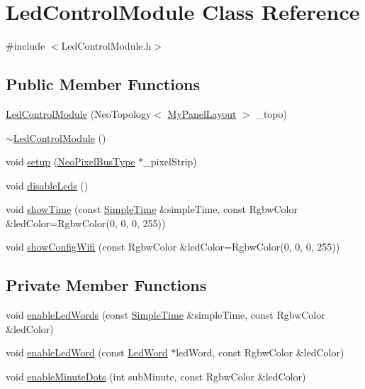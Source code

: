 \hypertarget{class_led_control_module}{}\section{Led\+Control\+Module Class Reference}
\label{class_led_control_module}


{\ttfamily \#include $<$Led\+Control\+Module.\+h$>$}

\subsection*{Public Member Functions}
\begin{DoxyCompactItemize}
\item 
\mbox{\hyperlink{class_led_control_module_a5a653e4a322f618a6937449fafe959bb}{Led\+Control\+Module}} (Neo\+Topology$<$ \mbox{\hyperlink{_led_control_module_8h_a49b2323848e516b3241e758de64f0b3b}{My\+Panel\+Layout}} $>$ \+\_\+topo)
\item 
\mbox{\hyperlink{class_led_control_module_af6763089aa43e6be196651ec6708a4cd}{$\sim$\+Led\+Control\+Module}} ()
\item 
void \mbox{\hyperlink{class_led_control_module_ae1eb70e65006f55b30f6a034706829b5}{setup}} (\mbox{\hyperlink{_led_control_module_8h_a51a7b766d62733fca1ec20e82e024f9f}{Neo\+Pixel\+Bus\+Type}} $\ast$\+\_\+pixel\+Strip)
\item 
void \mbox{\hyperlink{class_led_control_module_abd6255fc5d3a54b5befd131e56674313}{disable\+Leds}} ()
\item 
void \mbox{\hyperlink{class_led_control_module_a873a4c44c95a7da2ca0665b0e69cf392}{show\+Time}} (const \mbox{\hyperlink{class_simple_time}{Simple\+Time}} \&simple\+Time, const Rgbw\+Color \&led\+Color=Rgbw\+Color(0, 0, 0, 255))
\item 
void \mbox{\hyperlink{class_led_control_module_a70c42e2f9baee807bfdb9fe9bd2f6d8e}{show\+Config\+Wifi}} (const Rgbw\+Color \&led\+Color=Rgbw\+Color(0, 0, 0, 255))
\end{DoxyCompactItemize}
\subsection*{Private Member Functions}
\begin{DoxyCompactItemize}
\item 
void \mbox{\hyperlink{class_led_control_module_ac2e92014634c3cbfbcecff4473f39dac}{enable\+Led\+Words}} (const \mbox{\hyperlink{class_simple_time}{Simple\+Time}} \&simple\+Time, const Rgbw\+Color \&led\+Color)
\item 
void \mbox{\hyperlink{class_led_control_module_a5870c6c37010e51f6b3dbe4611a1c05c}{enable\+Led\+Word}} (const \mbox{\hyperlink{class_led_word}{Led\+Word}} $\ast$led\+Word, const Rgbw\+Color \&led\+Color)
\item 
void \mbox{\hyperlink{class_led_control_module_a6c8c6fcd7dc688fb8c14933f418488ed}{enable\+Minute\+Dots}} (int sub\+Minute, const Rgbw\+Color \&led\+Color)
\end{DoxyCompactItemize}
